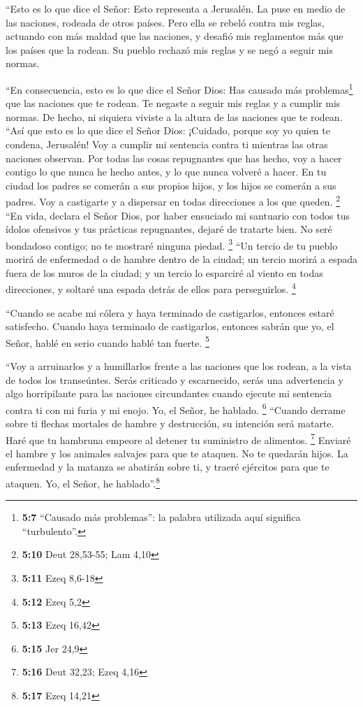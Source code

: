  ``Esto es lo que dice el Señor: Esto representa a
Jerusalén. La puse en medio de las naciones, rodeada de otros países.
 Pero ella se rebeló contra mis reglas, actuando con más
maldad que las naciones, y desafió mis reglamentos más que los países
que la rodean. Su pueblo rechazó mis reglas y se negó a seguir mis
normas.

 ``En consecuencia, esto es lo que dice el Señor Dios: Has
causado más problemas\footnote{\textbf{5:7} ``Causado más problemas'':
  la palabra utilizada aquí significa ``turbulento''.} que las naciones
que te rodean. Te negaste a seguir mis reglas y a cumplir mis normas. De
hecho, ni siquiera viviste a la altura de las naciones que te rodean.
 ``Así que esto es lo que dice el Señor Dios: ¡Cuidado,
porque soy yo quien te condena, Jerusalén! Voy a cumplir mi sentencia
contra ti mientras las otras naciones observan.  Por todas
las cosas repugnantes que has hecho, voy a hacer contigo lo que nunca he
hecho antes, y lo que nunca volveré a hacer.  En tu
ciudad los padres se comerán a sus propios hijos, y los hijos se comerán
a sus padres. Voy a castigarte y a dispersar en todas direcciones a los
que queden. \footnote{\textbf{5:10} Deut 28,53-55; Lam 4,10}
 ``En vida, declara el Señor Dios, por haber ensuciado mi
santuario con todos tus ídolos ofensivos y tus prácticas repugnantes,
dejaré de tratarte bien. No seré bondadoso contigo; no te mostraré
ninguna piedad. \footnote{\textbf{5:11} Ezeq 8,6-18} 
``Un tercio de tu pueblo morirá de enfermedad o de hambre dentro de la
ciudad; un tercio morirá a espada fuera de los muros de la ciudad; y un
tercio lo esparciré al viento en todas direcciones, y soltaré una espada
detrás de ellos para perseguirlos. \footnote{\textbf{5:12} Ezeq 5,2}

 ``Cuando se acabe mi cólera y haya terminado de
castigarlos, entonces estaré satisfecho. Cuando haya terminado de
castigarlos, entonces sabrán que yo, el Señor, hablé en serio cuando
hablé tan fuerte. \footnote{\textbf{5:13} Ezeq 16,42}

 ``Voy a arruinarlos y a humillarlos frente a las
naciones que los rodean, a la vista de todos los transeúntes.
 Serás criticado y escarnecido, serás una advertencia y
algo horripilante para las naciones circundantes cuando ejecute mi
sentencia contra ti con mi furia y mi enojo. Yo, el Señor, he hablado.
\footnote{\textbf{5:15} Jer 24,9}  ``Cuando derrame sobre
ti flechas mortales de hambre y destrucción, su intención será matarte.
Haré que tu hambruna empeore al detener tu suministro de alimentos.
\footnote{\textbf{5:16} Deut 32,23; Ezeq 4,16}  Enviaré
el hambre y los animales salvajes para que te ataquen. No te quedarán
hijos. La enfermedad y la matanza se abatirán sobre ti, y traeré
ejércitos para que te ataquen. Yo, el Señor, he hablado''.\footnote{\textbf{5:17}
  Ezeq 14,21}

